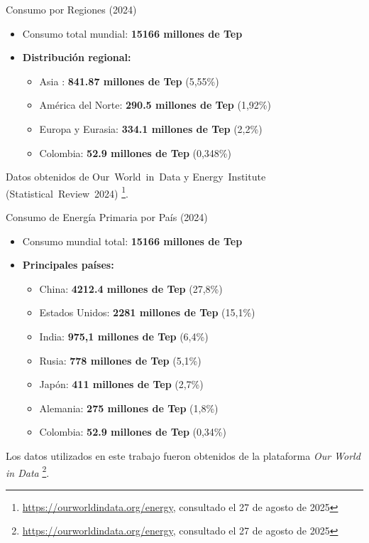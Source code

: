 \documentclass[main.tex]{subfiles}
\begin{document}
\begin{frame}{Consumo por Regiones (2024)}
    \begin{itemize}
        \item Consumo total mundial: \textbf{15166 millones de Tep}
        \item \textbf{Distribución regional:}
        \begin{itemize}
            \item Asia : \textbf{841.87 millones de Tep} (5{,}55\%)
            \item América del Norte: \textbf{290.5 millones de Tep} (1{,}92\%)
            \item Europa y Eurasia: \textbf{334.1 millones de Tep} (2{,}2\%)
            \item Colombia: \textbf{52.9  millones de Tep} (0{,}348\%)
        \end{itemize}
    \end{itemize}
    Datos obtenidos de Our World in Data y Energy Institute (Statistical Review 2024)%
    \footnote{\url{https://ourworldindata.org/energy}, consultado el 27 de agosto de 2025}.
\end{frame}


\begin{frame}{Consumo de Energía Primaria por País (2024)}
    \begin{itemize}
        \item Consumo mundial total: \textbf{15166 millones de Tep}
        \item \textbf{Principales países:}
        \begin{itemize}
            \item China: \textbf{4212.4 millones de Tep} (27{,8\%})
            \item Estados Unidos: \textbf{2281 millones de Tep} (15{,1\%})
            \item India: \textbf{975,1 millones de Tep} (6{,4\%})
            \item Rusia: \textbf{778 millones de Tep} (5{,1\%})
            \item Japón: \textbf{411 millones de Tep} (2{,7\%})
            \item Alemania: \textbf{275 millones de Tep} (1{,8\%})
            \item Colombia: \textbf{52.9 millones de Tep} (0{,34\%})
        \end{itemize}
    \end{itemize}
    Los datos utilizados en este trabajo fueron obtenidos de la plataforma \textit{Our World in Data}%
    \footnote{\url{https://ourworldindata.org/energy}, consultado el 27 de agosto de 2025}.
\end{frame}
\end{document}
